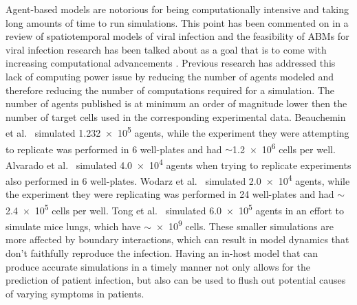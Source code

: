 Agent-based models are notorious for being computationally intensive and taking long amounts of time to run simulations. This point has been commented on in a review of spatiotemporal models of viral infection \citep{gallagher_causes_2018} and the feasibility of ABMs for viral infection research has been talked about as a goal that is to come with increasing computational advancements \citep{bauer_agent-based_2009}. Previous research has addressed this lack of computing power issue by reducing the number of agents modeled and therefore reducing the number of computations required for a simulation. The number of agents published is at minimum an order of magnitude lower then the number of target cells used in the corresponding experimental data. Beauchemin et al.\ \citep{beauchemin_simple_2005} simulated \num{1.232e5} agents, while the experiment they were attempting to replicate was performed in 6 well-plates and had $\sim$\num{1.2e6} cells per well. Alvarado et al.\ \citep{alvarado_cellular-level_2018} simulated \num{4.0e4} agents when trying to replicate experiments also performed in 6 well-plates. Wodarz et al.\ \citep{wodarz_laws_2014} simulated \num{2.0e4} agents, while the experiment they were replicating was performed in 24 well-plates and had $\sim$\num{2.4e5} cells per well. Tong et al.\ \citep{tong_development_2015} simulated \num{6.0e5} agents in an effort to simulate mice lungs, which have $\sim$\num{e9} cells. These smaller simulations are more affected by boundary interactions, which can result in model dynamics that don't faithfully reproduce the infection. Having an in-host model that can produce accurate simulations in a timely manner not only allows for the prediction of patient infection, but also can be used to flush out potential causes of varying symptoms in patients. 

